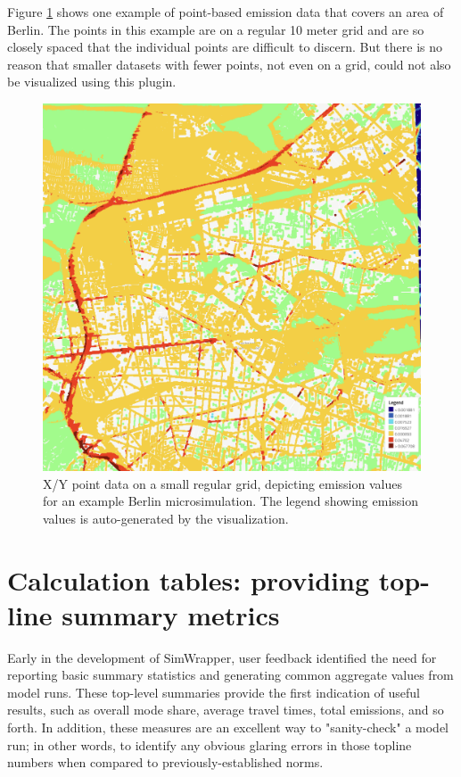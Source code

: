 Figure \ref{fig:simwrapper-xy-point-data} shows one example of point-based emission data that covers an area of Berlin. The points in this example are on a regular 10 meter grid and are so closely spaced that the individual points are difficult to discern. But there is no reason that smaller datasets with fewer points, not even on a grid, could not also be visualized using this plugin.

\begin{figure}[ht]
  \centering
  \includegraphics[width=0.6\linewidth]{chapters/31-simwrapper/images/xy-point-data.png}
  \caption{X/Y point data on a small regular grid, depicting emission values for an example Berlin microsimulation. The legend showing emission values is auto-generated by the visualization.}
  \label{fig:simwrapper-xy-point-data}
\end{figure}


\hypertarget{simwrapper-calculation-tables}{%
\section{Calculation tables: providing top-line summary metrics}
\label{simwrapper-calculation-tables}}

Early in the development of SimWrapper, user feedback identified the need for reporting basic summary statistics and generating common aggregate values from model runs. These top-level summaries provide the first indication of useful results, such as overall mode share, average travel times, total emissions, and so forth. In addition, these measures are an excellent way to "sanity-check" a model run; in other words, to identify any obvious glaring errors in those topline numbers when compared to previously-established norms.

